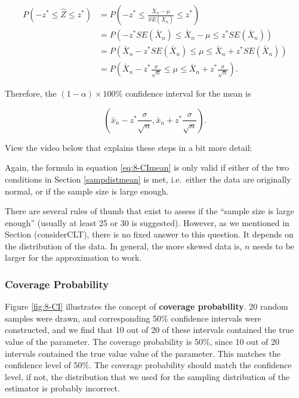 \documentclass[
]{book}
\begin{document}
\begin{equation} 
\begin{split}
P(-z^{*} \leq \hat{Z} \leq z^{*}) &= P(-z^{*} \leq \frac{\bar{X}_n - \mu}{SE(\bar{X}_n)} \leq z^{*}) \\
                                  &= P\left(-z^{*}SE(\bar{X}_n) \leq \bar{X}_n - \mu \leq z^{*}SE(\bar{X}_n)\right) \\
                                  &= P\left(\bar{X}_n - z^{*}SE(\bar{X}_n) \leq \mu \leq \bar{X}_n + z^{*}SE(\bar{X}_n)\right) \\
                                  &= P\left(\bar{X}_n - z^{*} \frac{\sigma}{\sqrt{n}} \leq \mu \leq \bar{X}_n + z^{*} \frac{\sigma}{\sqrt{n}}\right).
\end{split}
\label{eq:8-CImeanwork}
\end{equation}

Therefore, the \((1-\alpha) \times 100\%\) confidence interval for the mean is

\begin{equation} 
\left( \bar{x}_n - z^{*} \frac{\sigma}{\sqrt{n}}, \bar{x}_n + z^{*} \frac{\sigma}{\sqrt{n}} \right).
\label{eq:8-CImean}
\end{equation}

View the video below that explains these steps in a bit more detail:

Again, the formula in equation \eqref{eq:8-CImean} is only valid if either of the two conditions in Section \ref{sampdistmean} is met, i.e.~either the data are originally normal, or if the sample size is large enough.

There are several rules of thumb that exist to assess if the ``sample size is large enough'' (usually at least 25 or 30 is suggested). However, as we mentioned in Section (considerCLT), there is no fixed answer to this question. It depends on the distribution of the data. In general, the more skewed data is, \(n\) needs to be larger for the approximation to work.

\subsubsection{Coverage Probability}\label{CP}

Figure \ref{fig:8-CI} illustrates the concept of \textbf{coverage probability}. 20 random samples were drawn, and corresponding 50\% confidence intervals were constructed, and we find that 10 out of 20 of these intervals contained the true value of the parameter. The coverage probability is 50\%, since 10 out of 20 intervals contained the true value value of the parameter. This matches the confidence level of 50\%. The coverage probability should match the confidence level, if not, the distribution that we used for the sampling distribution of the estimator is probably incorrect.
\end{document}
